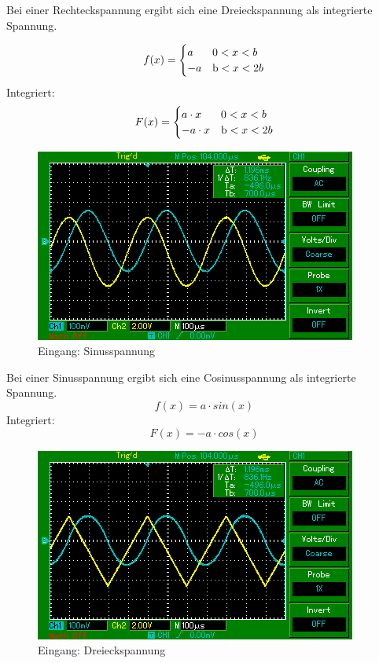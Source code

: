 Bei einer Rechteckspannung ergibt sich eine Dreieckspannung als integrierte Spannung.

\begin{equation*}
  f(x) =
  \begin{cases}
    a & \text 0 < x < b \\
    -a & \text b < x < 2b \\
  \end{cases}
\end{equation*}
Integriert:
\begin{equation*}
  F(x) =
  \begin{cases}
    a \cdot x & \text 0 < x < b \\
    -a \cdot x & \text b < x < 2b \\
  \end{cases}
\end{equation*}

\begin{figure}[H]
  \centering
  \includegraphics{MAP002.png}
  \caption{Eingang: Sinusspannung }
  \label{fig:Sinusspannung}
\end{figure}

Bei einer Sinusspannung ergibt sich eine Cosinusspannung als integrierte Spannung.
\begin{equation*}
  f(x) = a \cdot sin(x)
\end{equation*}
Integriert:
\begin{equation*}
  F(x) = -a \cdot cos(x)
\end{equation*}

\begin{figure}[H]
  \centering
  \includegraphics{MAP003.png}
  \caption{Eingang: Dreieckspannung}
  \label{fig:Dreieckspannung}
\end{figure}

